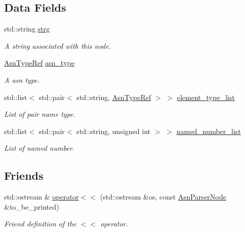 \subsection*{Data Fields}
\begin{DoxyCompactItemize}
\item 
std\+::string \hyperlink{structAsnParserNode_a433e32c0024310ce541131b87808067c}{strg}
\begin{DoxyCompactList}\small\item\em A string associated with this node. \end{DoxyCompactList}\item 
\hyperlink{asn__type_8hpp_a456d7cf50c15d087cc0428ae80834b35}{Asn\+Type\+Ref} \hyperlink{structAsnParserNode_af4dabbdb715c4944021b85b9fd3ccc3f}{asn\+\_\+type}
\begin{DoxyCompactList}\small\item\em A asn type. \end{DoxyCompactList}\item 
std\+::list$<$ std\+::pair$<$ std\+::string, \hyperlink{asn__type_8hpp_a456d7cf50c15d087cc0428ae80834b35}{Asn\+Type\+Ref} $>$ $>$ \hyperlink{structAsnParserNode_afa15078343d3e0c91e8cc2c86f07ae35}{element\+\_\+type\+\_\+list}
\begin{DoxyCompactList}\small\item\em List of pair name type. \end{DoxyCompactList}\item 
std\+::list$<$ std\+::pair$<$ std\+::string, unsigned int $>$ $>$ \hyperlink{structAsnParserNode_a29c6beda4d49411435e47901dcda4f97}{named\+\_\+number\+\_\+list}
\begin{DoxyCompactList}\small\item\em List of named number. \end{DoxyCompactList}\end{DoxyCompactItemize}
\subsection*{Friends}
\begin{DoxyCompactItemize}
\item 
std\+::ostream \& \hyperlink{structAsnParserNode_a5c63996b7ebcba3917f79cb4557ca054}{operator$<$$<$} (std\+::ostream \&os, const \hyperlink{structAsnParserNode}{Asn\+Parser\+Node} \&to\+\_\+be\+\_\+printed)
\begin{DoxyCompactList}\small\item\em Friend definition of the $<$$<$ operator. \end{DoxyCompactList}\end{DoxyCompactItemize}


